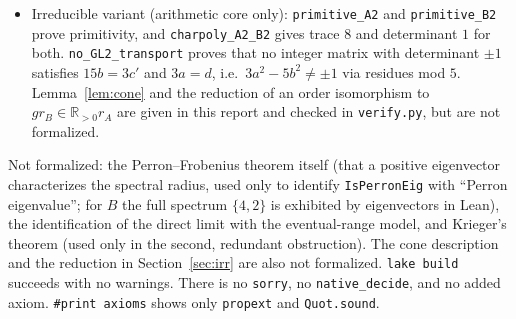 \documentclass[11pt]{article}
\theoremstyle{definition}
\theoremstyle{remark}
\newcommand{\Q}{\mathbb{Q}}
\begin{document}
\begin{itemize}
eigenvalues $\lambda_A,\lambda_B$ satisfying $\mathrm{Cond}(\lambda_A,\lambda_B)$,
$\Delta_A$ and $\Delta_B$ are order-isomorphic''. This is a special case of the
``if'' direction. \texttt{conjecture\_00000009614\_false} proves
$\neg$\texttt{IfDirection Cond} for every reflexive \texttt{Cond}.
\texttt{conjecture\_00000009614\_iff\_false} refutes the biconditional,
\texttt{conjecture\_00000009614\_group\_false} refutes the version with mere group
isomorphism, and \texttt{conjecture\_00000009614\_false\_Q} instantiates the
concrete reading $\lambda_A=\pm\lambda_B$ (field $\Q$, units $\{\pm1\}$).
\texttt{nonvacuous} records that all hypotheses are satisfiable.
\item Irreducible variant (arithmetic core only): \texttt{primitive\_A2} and
\texttt{primitive\_B2} prove primitivity, and \texttt{charpoly\_A2\_B2} gives trace
$8$ and determinant $1$ for both. \texttt{no\_GL2\_transport} proves that no integer
matrix with determinant $\pm1$ satisfies $15b=3c'$ and $3a=d$, i.e.\ $3a^2-5b^2\neq\pm1$
via residues mod $5$. Lemma~\ref{lem:cone} and the reduction of an order isomorphism
to $gr_B\in\mathbb R_{>0}r_A$ are given in this report and checked in
\texttt{verify.py}, but are not formalized.
\end{itemize}
Not formalized: the Perron--Frobenius theorem itself (that a positive eigenvector
characterizes the spectral radius, used only to identify \texttt{IsPerronEig} with
``Perron eigenvalue''; for $B$ the full spectrum $\{4,2\}$ is exhibited by
eigenvectors in Lean), the identification of the direct limit with the
eventual-range model, and Krieger's theorem (used only in the second, redundant
obstruction). The cone description and the reduction in Section~\ref{sec:irr} are also
not formalized. \texttt{lake build} succeeds with no warnings. There is no
\texttt{sorry}, no \texttt{native\_decide}, and no added axiom. \texttt{\#print
axioms} shows only \texttt{propext} and \texttt{Quot.sound}.
\end{document}
